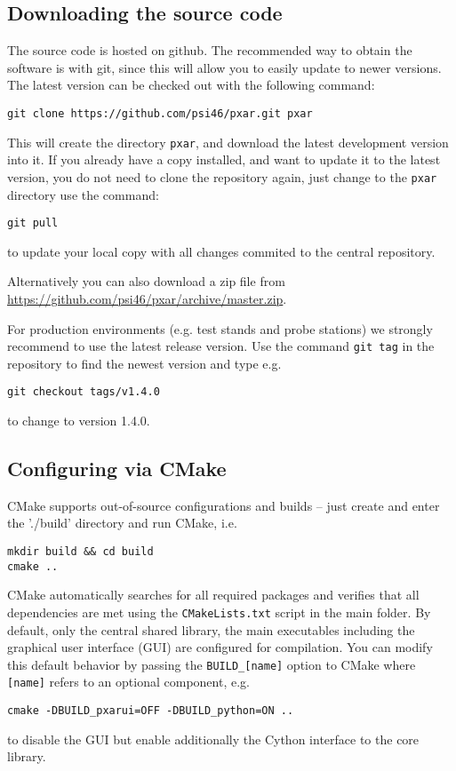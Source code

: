 \subsection{Downloading the source code}
The \pxar source code is hosted on github. The recommended way to obtain the software is with git, since this will allow you to easily update to newer versions. The latest version can be checked out with the following command:
\begin{verbatim}
git clone https://github.com/psi46/pxar.git pxar
\end{verbatim}

This will create the directory \texttt{pxar}, and download the latest development version into it. If you already have a copy installed, and want to update it to the latest version, you do not need to clone the repository again, just change to the \texttt{pxar} directory use the command:
\begin{verbatim}
git pull
\end{verbatim}
to update your local copy with all changes commited to the central repository.

Alternatively you can also download a zip file from
\url{https://github.com/psi46/pxar/archive/master.zip}.

For production environments (e.g. test stands and probe stations) we strongly recommend to use the latest release version. Use the command \texttt{git tag} in the repository to find the newest version and type e.g. 
\begin{verbatim}
git checkout tags/v1.4.0
\end{verbatim}
to change to version 1.4.0.

\subsection{Configuring via CMake}
CMake supports out-of-source configurations and builds -- just create and enter the './build' directory and run CMake, i.e.
\begin{verbatim}
mkdir build && cd build
cmake ..
\end{verbatim}

CMake automatically searches for all required packages and verifies that all dependencies are met using the \texttt{CMakeLists.txt} script in the main folder. By default, only the central shared library, the main executables including the graphical user interface (GUI) are configured for compilation. You can modify this default behavior by passing the \texttt{BUILD\_[name]} option to
CMake where \texttt{[name]} refers to an optional component, e.g.
\begin{verbatim}
cmake -DBUILD_pxarui=OFF -DBUILD_python=ON ..
\end{verbatim}
to disable the GUI but enable additionally the Cython interface to the core library.

